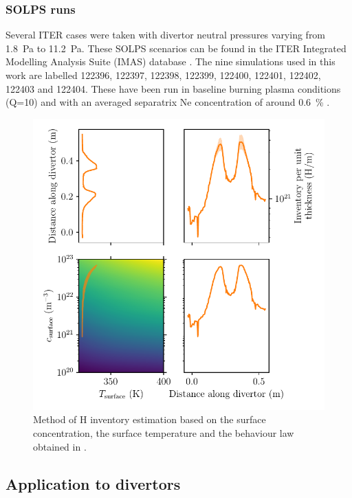 \subsubsection{SOLPS runs}
Several ITER cases were taken with divertor neutral pressures varying from \SI{1.8}{Pa} to \SI{11.2}{Pa}.
These SOLPS \cite{kaveeva_solps-iter_2020} scenarios can be found in the ITER Integrated Modelling Analysis Suite (IMAS) database \cite{imbeaux_design_2015, park_assessment_2020}.
The nine simulations used in this work are labelled 122396, 122397, 122398, 122399, 122400, 122401, 122402, 122403 and 122404.
These have been run in baseline burning plasma conditions (Q=10) and with an averaged separatrix Ne concentration of around \SI{0.6}{\%} \cite{pitts_physics_2019}.


\begin{figure}[h!]
    \centering
    \includegraphics[width=\linewidth]{Figures/divertor/example.pdf}
    \caption{Method of H inventory estimation based on the surface concentration, the surface temperature and the behaviour law obtained in \cite{delaporte-mathurin_parametric_2020}.}
    \label{fig: behaviour law example}
\end{figure}

\subsection{Application to divertors}

